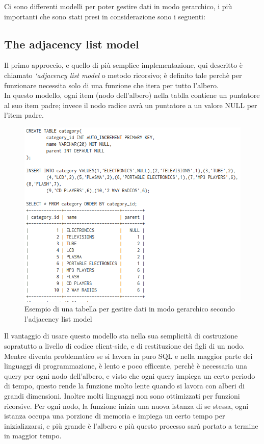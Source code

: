 Ci sono differenti modelli per poter gestire dati in modo gerarchico, i più importanti che sono stati presi in considerazione sono i 
seguenti:

\subsection{The adjacency list model}
Il primo approccio, e quello di più semplice implementazione, qui descritto è chiamato \textit{‘adjacency list model} o metodo ricorsivo;
è definito tale perchè per funzionare necessita solo di una funzione che itera per tutto l'albero.\\
In questo modello, ogni item (nodo dell'albero) nella tablla contiene un puntatore al suo item padre; invece il nodo radice avrà un puntatore a un valore
NULL per l'item padre.

\begin{figure}[ht!]
    \centering
	\includegraphics[scale=0.75]{images/Adjacency_list_model_table.PNG}
	\caption{Esempio di una tabella per gestire dati in modo gerarchico secondo l'adjacency list model }
\end{figure}
 
Il vantaggio di usare questo modello sta nella sua semplicità di costruzione sopratutto a livello di codice client-side, 
e di restituzione dei figli di un nodo. Mentre diventa problematico se si lavora in puro SQL e nella maggior parte dei linguaggi di 
programmazione, è lento e poco efficente, perchè è necessaria una query per ogni nodo dell'albero, e visto che ogni query impiega 
un certo periodo di tempo, questo rende la funzione molto lente quando si lavora con alberi di grandi dimensioni.
Inoltre molti linguaggi non sono ottimizzati per funzioni ricorsive. Per ogni nodo, la funzione inizia una nuova istanza di se stessa,
ogni istanza occupa una porzione di memoria e impiega un certo tempo per inizializzarsi, e più grande è l'albero e più questo 
processo sarà portato a termine in maggior tempo.

